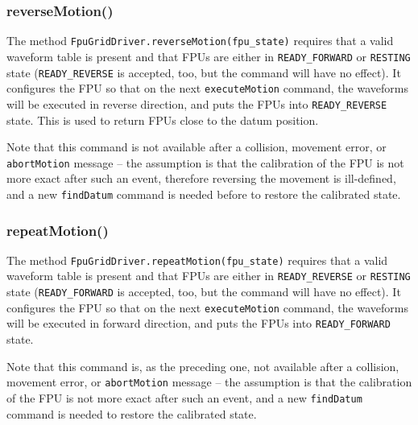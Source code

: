 \documentclass[11pt,a4paper]{scrartcl}
\begin{document}
\subsubsection{reverseMotion()}

\begin{sloppypar}
The method \texttt{FpuGridDriver.reverseMotion(fpu\_state)} requires
that a valid waveform table is present and that FPUs are either in
\texttt{READY\_FORWARD} or \texttt{RESTING} state
(\texttt{READY\_REVERSE} is accepted, too, but the command will have
no effect). It configures the FPU so that on the next
\texttt{executeMotion} command, the waveforms will be executed in
reverse direction, and puts the FPUs into \texttt{READY\_REVERSE}
state. This is used to return FPUs close to the datum position.
\end{sloppypar}

Note that this command is not available after a collision, movement
error, or \texttt{abortMotion} message -- the assumption is that the
calibration of the FPU is not more exact after such an event,
therefore reversing the movement is ill-defined, and a new
\texttt{findDatum} command is needed before to restore the calibrated
state.


\subsubsection{repeatMotion()}

\begin{sloppypar}
The method \texttt{FpuGridDriver.repeatMotion(fpu\_state)} requires
that a valid waveform table is present and that FPUs are either in
\texttt{READY\_REVERSE} or \texttt{RESTING} state
(\texttt{READY\_FORWARD} is accepted, too, but the command will have
no effect). It configures the FPU so that on the next
\texttt{executeMotion} command, the waveforms will be executed in
forward direction, and puts the FPUs into \texttt{READY\_FORWARD}
state. 
\end{sloppypar}

Note that this command is, as the preceding one, not available after a
collision, movement error, or \texttt{abortMotion} message -- the
assumption is that the calibration of the FPU is not more exact after
such an event, and a new \texttt{findDatum} command is needed to
restore the calibrated state.
\end{document}
